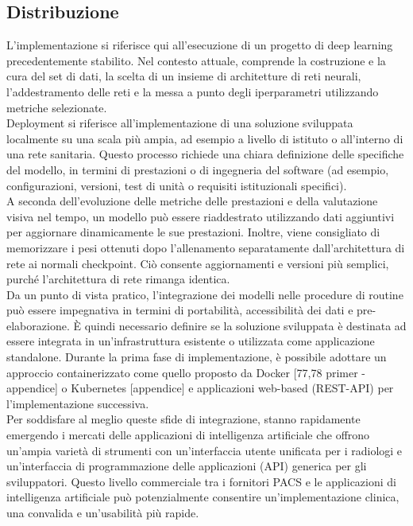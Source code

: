 \documentclass[12pt,a4paper]{report}
\begin{document}
\subsection{Distribuzione}
L'implementazione si riferisce qui all'esecuzione di un progetto di deep learning precedentemente stabilito. Nel contesto attuale, comprende la costruzione e la cura del set di dati, la scelta di un insieme di architetture di reti neurali, l'addestramento delle reti e la messa a punto degli iperparametri utilizzando metriche selezionate.\\
Deployment si riferisce all'implementazione di una soluzione sviluppata localmente su una scala più ampia, ad esempio a livello di istituto o all'interno di una rete sanitaria. Questo processo richiede una chiara definizione delle specifiche del modello, in termini di prestazioni o di ingegneria del software (ad esempio, configurazioni, versioni, test di unità o requisiti istituzionali specifici).\\
A seconda dell'evoluzione delle metriche delle prestazioni e della valutazione visiva nel tempo, un modello può essere riaddestrato utilizzando dati aggiuntivi per aggiornare dinamicamente le sue prestazioni.
Inoltre, viene consigliato di memorizzare i pesi ottenuti dopo l'allenamento separatamente dall'architettura di rete ai normali checkpoint. Ciò consente aggiornamenti e versioni più semplici, purché l'architettura di rete rimanga identica.\\
Da un punto di vista pratico, l'integrazione dei modelli nelle procedure di routine può essere impegnativa in termini di portabilità, accessibilità dei dati e pre-elaborazione. È quindi necessario definire se la soluzione sviluppata è destinata ad essere integrata in un'infrastruttura esistente o utilizzata come applicazione standalone. Durante la prima fase di implementazione, è possibile adottare un approccio containerizzato come quello proposto da Docker [77,78 primer - appendice] o Kubernetes [appendice] e applicazioni web-based (REST-API) per l'implementazione successiva.\\
Per soddisfare al meglio queste sfide di integrazione, stanno rapidamente emergendo i mercati delle applicazioni di intelligenza artificiale che offrono un'ampia varietà di strumenti con un'interfaccia utente unificata per i radiologi e un'interfaccia di programmazione delle applicazioni (API) generica per gli sviluppatori. Questo livello commerciale tra i fornitori PACS e le applicazioni di intelligenza artificiale può potenzialmente consentire un'implementazione clinica, una convalida e un'usabilità più rapide.\cite{montagnon2020deep}
\end{document}
